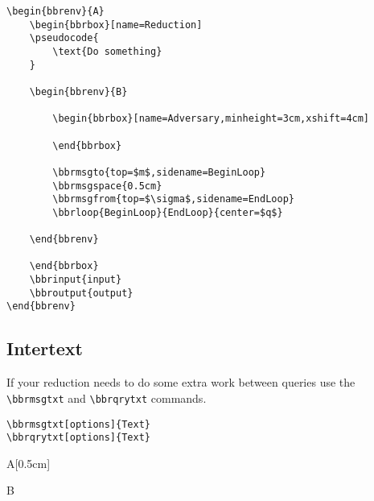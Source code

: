\documentclass[a4paper]{report}
\begin{document}
\begin{lstlisting}
\begin{bbrenv}{A}
	\begin{bbrbox}[name=Reduction]
	\pseudocode{
		\text{Do something}
	}

	\begin{bbrenv}{B}

		\begin{bbrbox}[name=Adversary,minheight=3cm,xshift=4cm]

		\end{bbrbox}

		\bbrmsgto{top=$m$,sidename=BeginLoop}
		\bbrmsgspace{0.5cm}
		\bbrmsgfrom{top=$\sigma$,sidename=EndLoop}
		\bbrloop{BeginLoop}{EndLoop}{center=$q$}

	\end{bbrenv}

	\end{bbrbox}
	\bbrinput{input}
	\bbroutput{output}
\end{bbrenv}
\end{lstlisting}

\subsection{Intertext}

If your reduction needs to do some extra work between queries use the \lstinline$\bbrmsgtxt$
and \lstinline$\bbrqrytxt$ commands.
\begin{lstlisting}
\bbrmsgtxt[options]{Text}
\bbrqrytxt[options]{Text}
\end{lstlisting}

\begin{bbrenv}[1cm]{A}[0.5cm]
	\begin{bbrbox}[name=Reduction]

	\begin{bbrenv}{B}

		\begin{bbrbox}[name=Adversary,minheight=3cm,xshift=4cm]

		\end{bbrbox}



	\end{bbrenv}

	\end{bbrbox}
\end{bbrenv}
\end{document}
